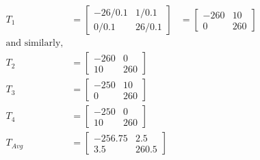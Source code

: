 \begin{equation}
    \begin{aligned}
        T_1 &= 
        \begin{bmatrix}
            -26/0.1 & 1/0.1 \\
            0/0.1 & 26/0.1
        \end{bmatrix} &= 
        \begin{bmatrix}
            -260 & 10 \\
            0 & 260
        \end{bmatrix}
        \\
        \text{and similarly,}
        \\
        T_2 &= 
        \begin{bmatrix}
            -260 & 0 \\
            10 & 260
        \end{bmatrix}
        \\
        T_3 &= 
        \begin{bmatrix}
            -250 & 10 \\
            0 & 260
        \end{bmatrix}
        \\
        T_4 &= 
        \begin{bmatrix}
            -250 & 0 \\
            10 & 260
        \end{bmatrix}
        \\
        T_{Avg} &= 
        \begin{bmatrix}
            -256.75 & 2.5 \\
            3.5 & 260.5
        \end{bmatrix}
    \end{aligned}
    \label{eqn:calib_matrices_permutations}
\end{equation}

